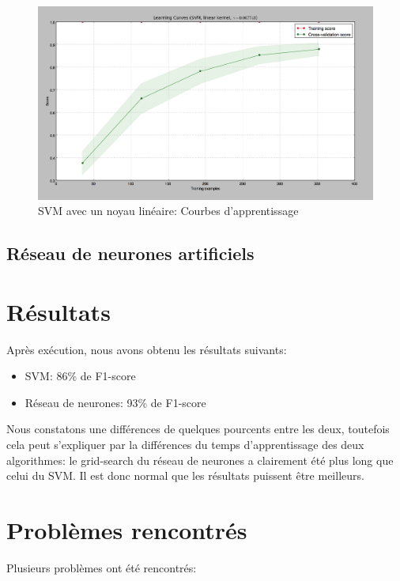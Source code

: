 \begin{figure}[!h]
\includegraphics[width=\textwidth]{pictures/hog-svm-training}
\caption{SVM avec un noyau linéaire: Courbes d'apprentissage}
\label{fig:hog-svm-training}
\end{figure}

\subsection{Réseau de neurones artificiels}


\section{Résultats}

Après exécution, nous avons obtenu les résultats suivants:
\begin{itemize}
\item SVM: 86\% de F1-score
\item Réseau de neurones: 93\% de F1-score
\end{itemize}
Nous constatons une différences de quelques pourcents entre les deux, toutefois cela peut s'expliquer par la différences du temps d'apprentissage des deux algorithmes: le grid-search du réseau de neurones a clairement été plus long que celui du SVM. Il est donc normal que les résultats puissent être meilleurs.

\section{Problèmes rencontrés}
Plusieurs problèmes ont été rencontrés:

